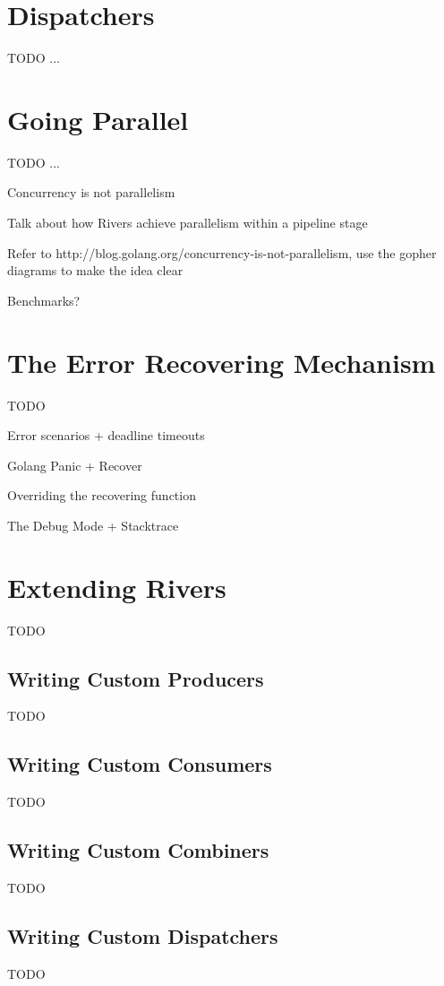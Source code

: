 \section{Dispatchers}
\label{sec:dispatchers}

TODO ...

\section{Going Parallel}
\label{sec:going_parallel}

TODO ...

Concurrency is not parallelism

Talk about how Rivers achieve parallelism within a pipeline stage

Refer to http://blog.golang.org/concurrency-is-not-parallelism, use the gopher diagrams to make the idea clear

Benchmarks?

\section{The Error Recovering Mechanism}
\label{sec:recovering_mechanism}

TODO

Error scenarios + deadline timeouts

Golang Panic + Recover

Overriding the recovering function

The Debug Mode + Stacktrace

\section{Extending Rivers}
\label{sec:extending_rivers}

TODO

\subsection{Writing Custom Producers}
\label{sec:custom_producers}

TODO

\subsection{Writing Custom Consumers}
\label{sec:custom_consumers}

TODO

\subsection{Writing Custom Combiners}
\label{sec:custom_combiners}

TODO

\subsection{Writing Custom Dispatchers}
\label{sec:custom_dispatchers}

TODO
